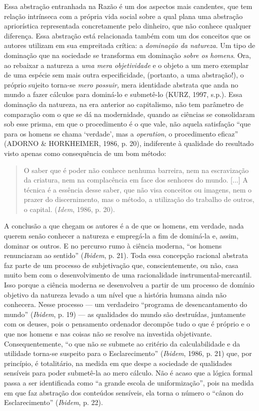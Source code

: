 Essa abstração entranhada na Razão é um dos aspectos mais candentes, que
tem relação intrínseca com a própria vida social sobre a qual plana uma
abstração apriorística representada concretamente pelo dinheiro, que não
conhece qualquer diferença. Essa abstração está relacionada também com
um dos conceitos que os autores utilizam em sua empreitada crítica: a
\emph{dominação da natureza}. Um tipo de dominação que na sociedade se
transforma em dominação \emph{sobre os homens}. Ora, ao rebaixar a
natureza a \emph{uma mera objetividade} e o objeto a um mero exemplar de
uma espécie sem mais outra especificidade, (portanto, a uma abstração!),
o próprio sujeito torna-se \emph{mero possuir,} mera identidade abstrata
que anda no mundo a fazer cálculos para dominá-lo e submetê-lo (KURZ,
1997, s.p.). Essa dominação da natureza, na era anterior ao capitalismo,
não tem parâmetro de comparação com o que se dá na modernidade, quando
as ciências se consolidaram sob esse prisma, em que o procedimento é o
que vale, não aquela satisfação ``que para os homens se chama `verdade',
mas a \emph{operation}, o procedimento eficaz'' (ADORNO \& HORKHEIMER,
1986, p. 20), indiferente à qualidade do resultado visto apenas como
consequência de um bom método:

\begin{quote}
O saber que é poder não conhece nenhuma barreira, nem na escravização da
criatura, nem na complacência em face dos senhores do mundo. {[}...{]} A
técnica é a essência desse saber, que não visa conceitos ou imagens, nem
o prazer do discernimento, mas o método, a utilização do trabalho de
outros, o capital. (\emph{Idem}, 1986, p. 20).
\end{quote}

A conclusão a que chegam os autores é a de que os homens, em verdade,
nada querem senão conhecer a natureza e empregá-la a fim de dominá-la e,
assim, dominar os outros. E no percurso rumo à ciência moderna, ``os
homens renunciaram ao sentido'' (\emph{Ibidem}, p. 21). Toda essa
concepção racional abstrata faz parte de um processo de subjetivação
que, conscientemente, ou não, casa muito bem com o desenvolvimento de
uma racionalidade instrumental-mercantil. Isso porque a ciência moderna
se desenvolveu a partir de um processo de domínio objetivo da natureza
levado a um nível que a história humana ainda não conhecera. Nesse
processo --- um verdadeiro ``programa de desencantamento do mundo''
(\emph{Ibidem}, p. 19) --- as qualidades do mundo são destruídas,
juntamente com os deuses, pois o pensamento ordenador decompõe tudo o
que é próprio e o que nos homens e nas coisas não se resolve na
investida objetivante. Consequentemente, ``o que não se submete ao
critério da calculabilidade e da utilidade torna-se suspeito para o
Esclarecimento'' (\emph{Ibidem}, 1986, p. 21) que, por princípio, é
totalitário, na medida em que despe a sociedade de qualidades sensíveis
para poder submetê-la ao mero cálculo. Não é acaso que a lógica formal
passa a ser identificada como ``a grande escola de uniformização'', pois
na medida em que faz abstração dos conteúdos sensíveis, ela torna o
número o ``cânon do Esclarecimento'' (\emph{Ibidem}, p. 22).

